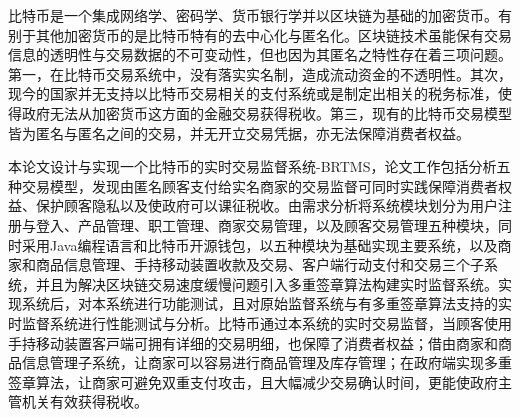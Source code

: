  
\begin{cabstract}

	⽐特币是⼀个集成网络学、密码学、货币银⾏学并以区块链为基础的加密货币。有别于其他加密货币的是⽐特币特有的去中⼼化与匿名化。区块链技术虽能保有交易信息的透明性与交易数据的不可变动性，但也因为其匿名之特性存在着三项问题。第一，在⽐特币交易系统中，没有落实实名制，造成流动资金的不透明性。其次，现今的国家并无⽀持以⽐特币交易相关的⽀付系统或是制定出相关的税务标准，使得政府无法从加密货币这⽅⾯的⾦融交易获得税收。第三，现有的⽐特币交易模型皆为匿名与匿名之间的交易，并无开⽴交易凭据，亦无法保障消费者权益。

	本论⽂设计与实现⼀个比特币的实时交易监督系统-BRTMS，论文工作包括分析五种交易模型，发现由匿名顾客支付给实名商家的交易监督可同时实践保障消费者权益、保护顾客隐私以及使政府可以课征税收。由需求分析将系统模块划分为用户注册与登入、产品管理、职工管理、商家交易管理，以及顾客交易管理五种模块，同时采用Java编程语言和比特币开源钱包，以五种模块为基础实现主要系统，以及商家和商品信息管理、手持移动装置收款及交易、客户端行动支付和交易三个子系统，并且为解决区块链交易速度缓慢问题引入多重签章算法构建实时监督系统。实现系统后，对本系统进行功能测试，且对原始监督系统与有多重签章算法支持的实时监督系统进行性能测试与分析。比特币通过本系统的实时交易监督，当顾客使用手持移动装置客⼾端可拥有详细的交易明细，也保障了消费者权益；借由商家和商品信息管理子系统，让商家可以容易进⾏商品管理及库存管理；在政府端实现多重签章算法，让商家可避免双重⽀付攻击，且大幅减少交易确认时间，更能使政府主管机关有效获得税收。

\end{cabstract}

